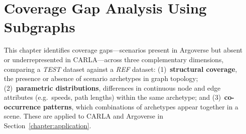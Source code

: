 \section{Coverage Gap Analysis Using Subgraphs}
\label{chapter:analysing_traffic_scene_with_subgraphs}



This chapter identifies coverage gaps---scenarios present in Argoverse but absent or underrepresented in CARLA---across three complementary dimensions, comparing a \textit{TEST} dataset against a \textit{REF} dataset: (1)~\textbf{structural coverage}, the presence or absence of scenario archetypes in graph topology; (2)~\textbf{parametric distributions}, differences in continuous node and edge attributes (e.g.\ speeds, path lengths) within the same archetype; and (3)~\textbf{co-occurrence patterns}, which combinations of archetypes appear together in a scene. These are applied to CARLA and Argoverse in Section~\ref{chapter:application}.
